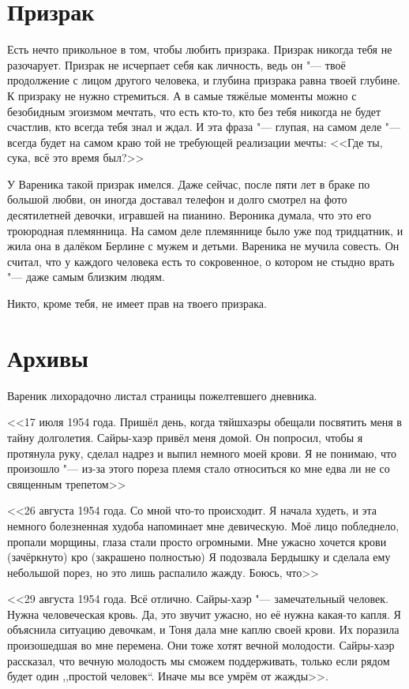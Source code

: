 \section{Призрак}

Есть нечто прикольное в том, чтобы любить призрака.
Призрак никогда тебя не разочарует.
Призрак не исчерпает себя как личность, ведь он "--- твоё продолжение с лицом другого человека, и глубина призрака равна твоей глубине.
К призраку не нужно стремиться.
А в самые тяжёлые моменты можно с безобидным эгоизмом мечтать, что есть кто-то, кто без тебя никогда не будет счастлив, кто всегда тебя знал и ждал.
И эта фраза "--- глупая, на самом деле "--- всегда будет на самом краю той не требующей реализации мечты: <<Где ты, сука, всё это время был?>>

У Вареника такой призрак имелся.
Даже сейчас, после пяти лет в браке по большой любви, он иногда доставал телефон и долго смотрел на фото десятилетней девочки, игравшей на пианино.
Вероника думала, что это его троюродная племянница.
На самом деле племяннице было уже под тридцатник, и жила она в далёком Берлине с мужем и детьми.
Вареника не мучила совесть.
Он считал, что у каждого человека есть то сокровенное, о котором не стыдно врать "--- даже самым близким людям.

Никто, кроме тебя, не имеет прав на твоего призрака.

\section{Архивы}

Вареник лихорадочно листал страницы пожелтевшего дневника.

<<17 июля 1954 года.
Пришёл день, когда тяйшхаэры обещали посвятить меня в тайну долголетия.
Сайры-хаэр привёл меня домой.
Он попросил, чтобы я протянула руку, сделал надрез и выпил немного моей крови.
Я не понимаю, что произошло "--- из-за этого пореза племя стало относиться ко мне едва ли не со священным трепетом\ldotst>>

<<26 августа 1954 года.
Со мной что-то происходит.
Я начала худеть, и эта немного болезненная худоба напоминает мне девическую.
Моё лицо побледнело, пропали морщины, глаза стали просто огромными.
Мне ужасно хочется крови (зачёркнуто) кро (закрашено полностью)
Я подозвала Бердышку и сделала ему небольшой порез, но это лишь распалило жажду.
Боюсь, что\ldotst>>

<<29 августа 1954 года.
Всё отлично.
Сайры-хаэр "--- замечательный человек. 
Нужна человеческая кровь.
Да, это звучит ужасно, но её нужна какая-то капля.
Я объяснила ситуацию девочкам, и Тоня дала мне каплю своей крови.
Их поразила произошедшая во мне перемена.
Они тоже хотят вечной молодости.
Сайры-хаэр рассказал, что вечную молодость мы сможем поддерживать, только если рядом будет один ,,простой человек``.
Иначе мы все умрём от жажды>>.

